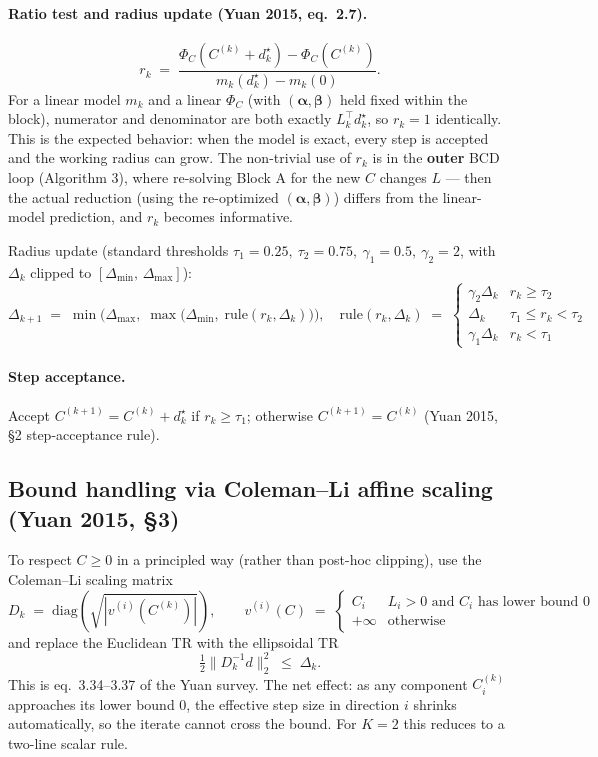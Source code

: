 \documentclass[11pt,a4paper]{article}
\begin{document}
\paragraph{Ratio test and radius update (Yuan 2015, eq.\ 2.7).}
\begin{equation}
r_k \;=\; \frac{\Phi_C(C^{(k)} + d_k^\star) - \Phi_C(C^{(k)})}{m_k(d_k^\star) - m_k(0)}.
\end{equation}
For a linear model $m_k$ and a linear $\Phi_C$ (with $(\boldsymbol\alpha,\boldsymbol\beta)$ held fixed within the block), numerator and denominator are both exactly $L_k^\top d_k^\star$, so $r_k = 1$ identically. This is the expected behavior: when the model is exact, every step is accepted and the working radius can grow. The non-trivial use of $r_k$ is in the \textbf{outer} BCD loop (Algorithm 3), where re-solving Block A for the new $C$ changes $L$ --- then the actual reduction (using the re-optimized $(\boldsymbol\alpha,\boldsymbol\beta)$) differs from the linear-model prediction, and $r_k$ becomes informative.

Radius update (standard thresholds $\tau_1=0.25,\ \tau_2=0.75,\ \gamma_1=0.5,\ \gamma_2=2$, with $\Delta_k$ clipped to $[\Delta_{\min},\,\Delta_{\max}]$):
\begin{equation}
\Delta_{k+1} \;=\;\min\!\Big(\Delta_{\max},\;\max\!\big(\Delta_{\min},\;\mathrm{rule}(r_k,\Delta_k)\big)\Big),\quad
\mathrm{rule}(r_k,\Delta_k) \;=\; \begin{cases}\gamma_2\Delta_k & r_k \ge \tau_2\\ \Delta_k & \tau_1 \le r_k < \tau_2\\ \gamma_1\Delta_k & r_k < \tau_1\end{cases}
\end{equation}

\paragraph{Step acceptance.} Accept $C^{(k+1)} = C^{(k)} + d_k^\star$ if $r_k \ge \tau_1$; otherwise $C^{(k+1)} = C^{(k)}$ (Yuan 2015, \S 2 step-acceptance rule).

\subsection{Bound handling via Coleman--Li affine scaling (Yuan 2015, \S 3)}

To respect $C \ge 0$ in a principled way (rather than post-hoc clipping), use the Coleman--Li scaling matrix
\[
D_k \;=\; \mathrm{diag}\!\left(\sqrt{|v^{(i)}(C^{(k)})|}\right),\qquad
v^{(i)}(C) \;=\; \begin{cases} C_i & L_i > 0 \text{ and } C_i \text{ has lower bound } 0 \\ +\infty & \text{otherwise} \end{cases}
\]
and replace the Euclidean TR with the ellipsoidal TR
\[
\tfrac12\|D_k^{-1} d\|_2^2 \;\le\; \Delta_k.
\]
This is eq.\ 3.34--3.37 of the Yuan survey. The net effect: as any component $C_i^{(k)}$ approaches its lower bound $0$, the effective step size in direction $i$ shrinks automatically, so the iterate cannot cross the bound. For $K = 2$ this reduces to a two-line scalar rule.
\end{document}
